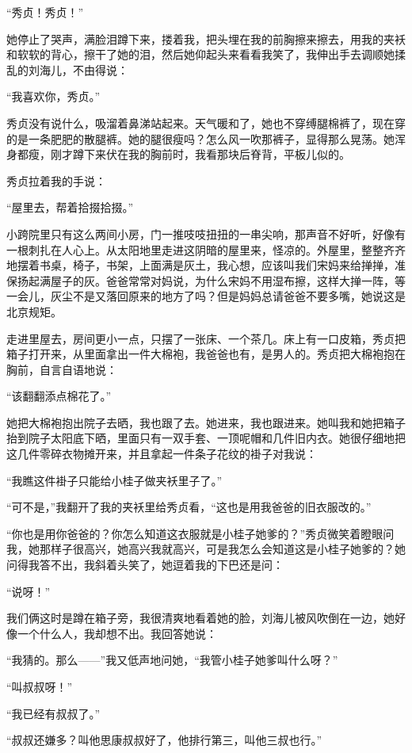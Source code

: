 \par “秀贞！秀贞！”
\par 她停止了哭声，满脸泪蹲下来，搂着我，把头埋在我的前胸擦来擦去，用我的夹袄和软软的背心，擦干了她的泪，然后她仰起头来看看我笑了，我伸出手去调顺她揉乱的刘海儿，不由得说：
\par “我喜欢你，秀贞。”
\par 秀贞没有说什么，吸溜着鼻涕站起来。天气暖和了，她也不穿缚腿棉裤了，现在穿的是一条肥肥的散腿裤。她的腿很瘦吗？怎么风一吹那裤子，显得那么晃荡。她浑身都瘦，刚才蹲下来伏在我的胸前时，我看那块后脊背，平板儿似的。
\par 秀贞拉着我的手说：
\par “屋里去，帮着拾掇拾掇。”
\par 小跨院里只有这么两间小房，门一推吱吱扭扭的一串尖响，那声音不好听，好像有一根刺扎在人心上。从太阳地里走进这阴暗的屋里来，怪凉的。外屋里，整整齐齐地摆着书桌，椅子，书架，上面满是灰土，我心想，应该叫我们宋妈来给掸掸，准保扬起满屋子的灰。爸爸常常对妈说，为什么宋妈不用湿布擦，这样大掸一阵，等一会儿，灰尘不是又落回原来的地方了吗？但是妈妈总请爸爸不要多嘴，她说这是北京规矩。
\par 走进里屋去，房间更小一点，只摆了一张床、一个茶几。床上有一口皮箱，秀贞把箱子打开来，从里面拿出一件大棉袍，我爸爸也有，是男人的。秀贞把大棉袍抱在胸前，自言自语地说：
\par “该翻翻添点棉花了。”
\par 她把大棉袍抱出院子去晒，我也跟了去。她进来，我也跟进来。她叫我和她把箱子抬到院子太阳底下晒，里面只有一双手套、一顶呢帽和几件旧内衣。她很仔细地把这几件零碎衣物摊开来，并且拿起一件条子花纹的褂子对我说：
\par “我瞧这件褂子只能给小桂子做夹袄里子了。”
\par “可不是，”我翻开了我的夹袄里给秀贞看，“这也是用我爸爸的旧衣服改的。”
\par “你也是用你爸爸的？你怎么知道这衣服就是小桂子她爹的？”秀贞微笑着瞪眼问我，她那样子很高兴，她高兴我就高兴，可是我怎么会知道这是小桂子她爹的？她问得我答不出，我斜着头笑了，她逗着我的下巴还是问：
\par “说呀！”
\par 我们俩这时是蹲在箱子旁，我很清爽地看着她的脸，刘海儿被风吹倒在一边，她好像一个什么人，我却想不出。我回答她说：
\par “我猜的。那么——”我又低声地问她，“我管小桂子她爹叫什么呀？”
\par “叫叔叔呀！”
\par “我已经有叔叔了。”
\par “叔叔还嫌多？叫他思康叔叔好了，他排行第三，叫他三叔也行。”
